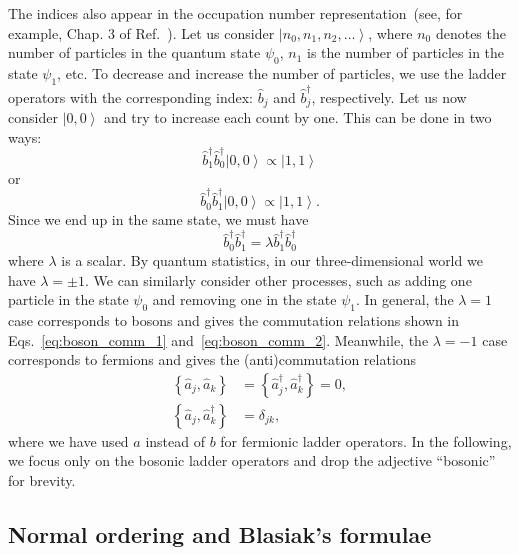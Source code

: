 \documentclass[5p, twocolumn, 10pt, sort&compress]{elsarticle}
\newcommand{\ket}[1]{\left|{#1}\right\rangle}
\newcommand{\acomm}[2]{\left\{{#1},{#2}\right\}}
\newcommand{\bop}{\hat{b}}
\newcommand{\bdag}{\bop^\dagger}
\begin{document}
The indices also appear in the occupation number representation~(see, for
example, Chap. 3 of Ref.~\cite{lancaster_quantum_2014}). Let us consider
$\left |{n_{0},n_{1},n_{2},\dots }\right \rangle $, where $n_{0}$ denotes
the number of particles in the quantum state $\psi _{0}$, $n_{1}$ is the
number of particles in the state $\psi _{1}$, etc. To decrease and increase the number of particles, we use the ladder operators
with the corresponding index: $\hat{b}_{j}$ and
$\hat{b}^{\dagger }_{j}$, respectively. Let us now consider $\left |{0,0}\right \rangle $ and try to increase each count by one. This
can be done in two ways:
\begin{equation}
    \bdag_1\bdag_0\ket{0,0}\propto\ket{1,1}
\end{equation}
or
\begin{equation}
    \bdag_0\bdag_1\ket{0,0}\propto\ket{1,1}.
\end{equation}
Since we end up in the same state, we must have
\begin{equation}
    \bdag_0\bdag_1=\lambda\bdag_1\bdag_0
\end{equation}
where $\lambda$ is a scalar.  By quantum statistics, in our three-dimensional world we have $\lambda=\pm 1$.  We can similarly consider other processes, such as adding one particle in the state $\psi_0$ and removing one in the state $\psi_1$.  In general, the $\lambda=1$ case corresponds to bosons and gives the commutation relations shown in Eqs.~\eqref{eq:boson_comm_1} and~\eqref{eq:boson_comm_2}.  Meanwhile, the $\lambda=-1$ case corresponds to fermions and gives the (anti)commutation relations
\begin{subequations}
\begin{align}
    \acomm{\hat{a}_j}{\hat{a}_k} &= \acomm{\hat{a}_j^\dagger}{\hat{a}_k^\dagger} = 0,
    \\
    \acomm{\hat{a}_j}{\hat{a}_k^\dagger} &= \delta_{jk},
\end{align}
\end{subequations}
where we have used $a$ instead of $b$ for fermionic ladder operators. 
 In the following, we focus only on the bosonic ladder operators and drop the adjective ``bosonic'' for brevity. 


\subsection{Normal ordering and Blasiak's formulae}\label{subsec:normal_ordering}
\end{document}
